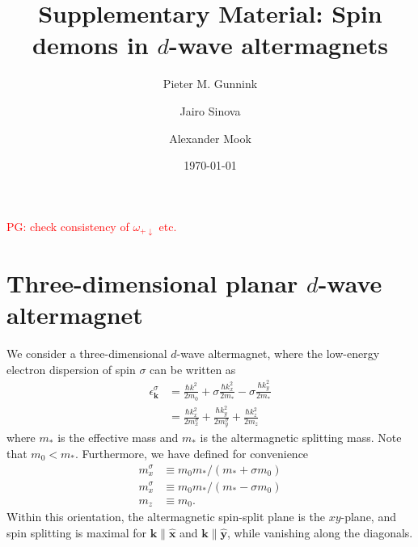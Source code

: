 \documentclass[aps,prb,reprint,twocolumns,superscriptaddress,nofootinbib]{revtex4-2}
\newcommand{\pg}[1]{\textcolor{red}{PG: #1}}
\newcommand{\xx}{\hat{\bm{x}}}
\newcommand{\yy}{\hat{\bm{y}}}
\begin{document}
	\title{Supplementary Material: Spin demons in $d$-wave altermagnets}
	\date{\today}
	
	\author{Pieter M. Gunnink}
	\author{Jairo Sinova}
	\author{Alexander Mook}
	\address{Johannes Gutenberg University Mainz, Staudingerweg 7, Mainz 55128, Germany}
	\begin{abstract}
		
	\end{abstract}
	
	\maketitle
	
	
	\pg{check consistency of $\omega_{+\downarrow}$ etc.}
	
	\section{Three-dimensional planar $d$-wave altermagnet}
	We consider a three-dimensional $d$-wave altermagnet, where the low-energy electron dispersion of spin $\sigma$ can be written as \cite{smejkalEmergingResearchLandscape2022,smejkalAnomalousHallAntiferromagnets2022}
	\begin{align}
		\epsilon_{\bm k}^\sigma &= \frac{\hbar k^2}{2m_0} + \sigma \frac{\hbar k_x^2}{2m_*} - \sigma \frac{\hbar k_y^2}{2m_*} \\
		&=\frac{\hbar k_x^2}{2m_x^\sigma}+ \frac{\hbar k_y^2}{2m_y^\sigma} +\frac{\hbar k_z^2}{2m_z}
	\end{align}
	where $m_*$ is the effective mass and $m_*$ is the altermagnetic splitting mass. Note that $m_0<m_*$. Furthermore, we have defined for convenience
	\begin{align}
		m_x^\sigma &\equiv m_0 m_* / (m_*+\sigma m_0) \\
		m_x^\sigma&\equiv m_0 m_* / (m_*-\sigma m_0) \\ 
		m_z&\equiv m_0.
	\end{align} 
	Within this orientation, the altermagnetic spin-split plane is the $xy$-plane, and spin splitting is maximal for $\bm k \parallel \xx$ and $\bm k \parallel \yy$, while vanishing along the diagonals.
	
\end{document}
